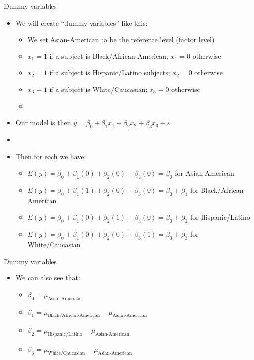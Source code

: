 \documentclass[xcolor=dvipsnames]{beamer}
\begin{document}
\begin{frame}{Dummy variables}
	\begin{itemize}
		\item We will create ``dummy variables'' like this: \pause
		\begin{itemize}
			\item We set Asian-American to be the reference level (factor level) \pause
			\item $x_1 = 1$ if a subject is Black/African-American; $x_1 = 0$ otherwise \pause
			\item $x_2 = 1$ if a subject is Hispanic/Latino subjects; $x_2 = 0$ otherwise \pause
			\item $x_3 = 1$ if a subject is White/Caucasian; $x_3 = 0$ otherwise \pause
			\item[]
		\end{itemize}
	\item Our model is then $y = \beta_0 + \beta_1 x_1 + \beta_2 x_2 + \beta_3 x_3 + \varepsilon$ \pause
	\item[]
	\item Then for each we have: \pause
	\begin{itemize}
		\item $E(y) = \beta_0 + \beta_1(0) + \beta_2(0) + \beta_3(0) = \beta_0$ for Asian-American \pause
		\item $E(y) = \beta_0 + \beta_1(1) + \beta_2(0) + \beta_3(0) = \beta_0 + \beta_1$ for Black/African-American \pause
		\item $E(y) = \beta_0 + \beta_1(0) + \beta_2(1) + \beta_3(0) = \beta_0 + \beta_2$ for Hispanic/Latino \pause
		\item $E(y) = \beta_0 + \beta_1(0) + \beta_2(0) + \beta_3(1) = \beta_0 + \beta_3$ for White/Caucasian
	\end{itemize}
	\end{itemize}
\end{frame}

\begin{frame}{Dummy variables}
	\begin{itemize}
		\item We can also see that: \pause
		\begin{itemize}
			\item $\beta_0 = \mu_{\text{Asian-American}}$ \pause
			\item $\beta_1 = \mu_{\text{Black/African-American}} -\mu_{\text{Asian-American}}$ \pause
			\item $\beta_2 = \mu_{\text{Hispanic/Latino}}- \mu_{\text{Asian-American}}$ \pause
			\item $\beta_3 = \mu_{\text{White/Caucasian}} - \mu_{\text{Asian-American}}$
		\end{itemize}
	\end{itemize}
\end{frame}
\end{document}
